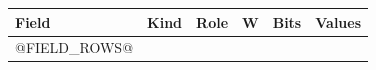 \par\noindent
\begin{tabularx}{\linewidth}{@{}>{\raggedright\arraybackslash}p{0.28in}>{\raggedright\arraybackslash}p{0.52in}>{\raggedright\arraybackslash}p{0.80in}>{\raggedright\arraybackslash}p{0.36in}>{\raggedright\arraybackslash}p{0.52in}>{\raggedright\arraybackslash}X@{}}
\toprule
\rowcolor{BedrockHeaderFill}
\textbf{Field} & \textbf{Kind} & \textbf{Role} & \textbf{W} & \textbf{Bits} & \textbf{Values}\\
\midrule
@FIELD_ROWS@
\bottomrule
\end{tabularx}\par
